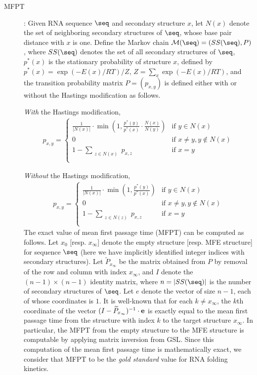 \begin{description}
\item[MFPT]: Given RNA sequence $\seq$ and secondary structure $x$,
let $N(x)$ denote the set of neighboring secondary structures of
$\seq$, whose base pair distance with $x$ is one. Define the Markov
chain $\mathcal{M}(\seq)=(SS(\seq),P)$, where $SS(\seq)$ denotes the
set of all secondary structures of $\seq$, $p^*(x)$ is the stationary
probability of structure $x$, defined by $p^*(x)=\exp(-E(x)/RT)/Z$,
$Z=\sum_{x} \exp(-E(x)/RT)$, and the transition probability matrix $P
= ( p_{x,y} )$ is defined either with or without the Hastings
modification as follows.

{\em With} the Hastings modification,
\begin{eqnarray}
\label{eqn:MFPTwithHastings} p_{x,y} = \left\{
\begin{array}{ll}
\frac{1}{|N(x)|} \cdot \min(1, \frac{p^*(y)}{p^*(x)} \cdot
\frac{N(x)}{N(y)}) &\mbox{if $y \in N(x)$}\\
0 &\mbox{if $x \ne y, y \not\in N(x)$}\\
1 - \sum_{\substack{z \in N(x)}} p_{x,z} &\mbox{if $x=y$}\\
\end{array}
\right.
\end{eqnarray}

{\em Without} the Hastings modification,
\begin{eqnarray}
\label{eqn:MFPTwithoutHastings} p_{x,y} = \left\{
\begin{array}{ll}
\frac{1}{|N(x)|} \cdot \min(1, \frac{p^*(y)}{p^*(x)} ) &\mbox{if $y
\in N(x)$}\\
0 &\mbox{if $x \ne y, y \not\in N(x)$}\\
1 - \sum_{\substack{z \in N(z)}} p_{x,z} &\mbox{if $x=y$}\\
\end{array}
\right.
\end{eqnarray}
The exact value of mean first passage time (MFPT) can be computed as
follows. Let $x_0$ [resp. $x_{\infty}$] denote the empty structure
[resp. MFE structure] for sequence $\seq$ (here we have implicitly
identified integer indices with secondary structures). Let
$\widetilde{P}_{x_{\infty}}$ be the matrix obtained from $P$ by
removal of the row and column with index $x_{\infty}$, and $I$ denote
the $(n-1)\times(n-1)$ identity matrix, where $n=|SS(\seq)|$ is the
number of secondary structures of $\seq$. Let $e$ denote the vector of
size $n-1$, each of whose coordinates is $1$. It is well-known
\cite{meyerMFPT} that for each $k\ne x_{\infty}$, the $k$th coordinate
of the vector $(I - \widetilde{P}_{x_{\infty}})^{-1} \cdot {\bf e}$ is
exactly equal to the mean first passage time from the structure with
index $k$ to the target structure $x_{\infty}$. In particular, the
MFPT from the empty structure to the MFE structure is computable by
applying matrix inversion from GSL. Since this computation of the
mean first passage time is mathematically exact, we consider that MFPT
to be the {\em gold standard} value for RNA folding kinetics.


\end{description}

